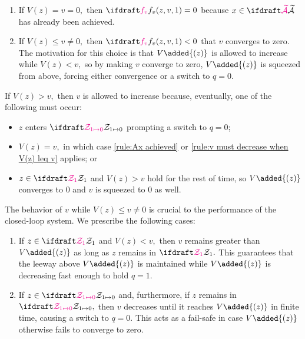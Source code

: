 {%
\setupAssumption[R] %
\begin{enumerate}
    \item If $V(z) = v = 0,$ then $\fv(z, v, 1) = 0$ 
    because $x\in \calAX$ has already been achieved.
    \label{rule:Ax achieved}
    \item If $V(z) \leq v \neq 0,$ then 
    $\fv(z, v, 1) < 0$  that $v$ converges to zero.
    The motivation for this choice is that $V\added{(z)}$ 
    is allowed to increase while $V(z) < v,$ so
    by making $v$ converge to zero, $V\added{(z)}$ is squeezed from 
    above, forcing either convergence or a switch to $q=0.$%
    \label{rule:v must decrease when V(z) leq v}%
    \setcounter{rulesCounter}{\value{enumi}}%
\end{enumerate}
If $V(z) > v,$ then $v$ is allowed to increase because,
eventually, one of the following must occur:
\begin{itemize}
    \item $z$ enters $\calZswitchtozero$ 
    prompting a switch to $q=0$;
    \item $V(z) = v,$ in which case \ref{rule:Ax achieved} or
    \ref{rule:v must decrease when V(z) leq v} applies; or
    \item $z \in \calZholdone$ and $V(z) > v$ hold for the rest of time,
    so $V\added{(z)}$ converges to $0$ and $v$ is squeezed to $0$ as well.
\end{itemize}

The behavior of $v$ while $V(z) \leq v \neq 0$ is 
crucial to the performance of the closed-loop system.
We prescribe the following cases:
\begin{enumerate}%
    \setcounter{enumi}{\value{rulesCounter}}
    \item If $z\in \calZholdone$ and $V(z) < v,$
    then $v$ remains greater than $V\added{(z)}$ 
    as long as $z$ remains in $\calZholdone.$ 
    This guarantees that the leeway above $V\added{(z)}$ 
    is maintained while $V\added{(z)}$ is decreasing fast enough to hold $q=1.$
    \label{rule:V(z) < v while dot V_1(Z) small enough}
    
    \item If $z \in \calZswitchtozero$ 
    and, furthermore, if $z$ remains in $\calZswitchtozero,$ 
    then $v$ decreases until it reaches $V\added{(z)}$ in finite time, 
    causing a switch to $q=0.$
    This acts as a fail-safe in case $V\added{(z)}$ 
    otherwise fails to converge to zero.
    \label{rule:fv < dot V1}


\end{enumerate}}
